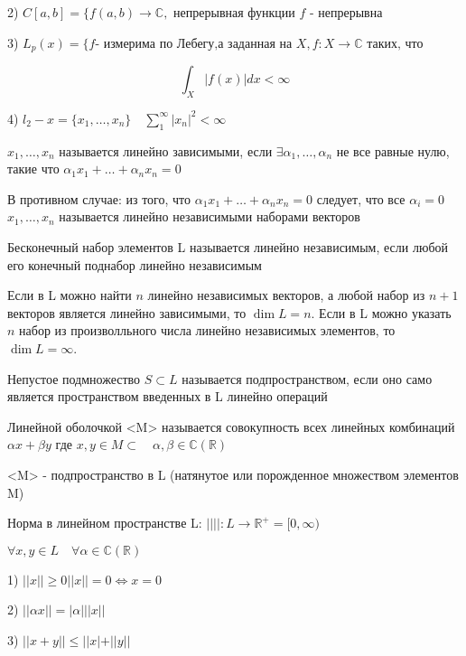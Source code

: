 \documentclass[12pt, a4paper]{report}
\begin{document}
2) \( C[a,b] = \{f(a,b) \to  \mathbb{C}, \text{ непрерывная функции } f \text{ - непрерывна }   \) 

3) \(\displaystyle  L_p (x)= \{f \text{- измерима по Лебегу,а заданная на } X , f: X \to  \mathbb{C} \text{ таких, что }   \)

\[  \int_{X}|f(x)|dx< \infty  \] 

4) \(\displaystyle  l_2 - x = \{x_1 , \ldots , x_n  \} \quad \sum ^{\infty }_{1}  |x_n| ^2 < \infty  \) 

\begin{definition}
    \( x_1, \ldots, x_n \)  называется линейно зависимыми, если \( \exists \alpha_1 , \ldots , \alpha _ n   \) не все равные нулю, такие что \( \alpha_1 x_1 + \dots + \alpha_n x_n=0   \)
    
    В противном случае: из того, что \( \alpha_1 x_1 + \dots + \alpha_n x_n=0 \) следует, что все \( \alpha_i =0  \) \( x_1, \ldots, x_n \)  называется линейно независимыми наборами  векторов  
\end{definition}

\begin{definition}
    Бесконечный набор элементов L называется линейно независимым, если любой его конечный поднабор линейно независимым
\end{definition}

\begin{definition}
    Если в L можно найти \( n  \)  линейно независимых векторов, а любой набор из \( n+1 \) векторов является линейно зависимыми, то \( \dim L= n \). Если в L можно указать \( n \)   набор из произволльного числа линейно независимых элементов, то \( \dim L= \infty  \). 
\end{definition}

\begin{definition}
    Непустое подмножество \( S \subset L  \)  называется подпространством, если оно само является пространством введенных в L линейно операций
\end{definition}

\begin{definition}
    Линейной  оболочкой  <M> называется совокупность всех линейных комбинаций  \( \alpha x + \beta y  \)  где \(  x,y \in  M  \subset \quad \alpha, \beta \in  \mathbb{C}(\mathbb{R}) \) 

    <M> - подпространство в L  (натянутое или порожденное множеством элементов M)
\end{definition}


\begin{definition}
    Норма в линейном пространстве L:  \( || || : L \to  \mathbb{R}^+ = [ 0 , \infty ) \)

    \( \forall x,y \in  L \quad  \forall  \alpha \in  \mathbb{C}(\mathbb{R}) \) 
    
    1) \( ||x|| \geq  0 ||x||=0 \Leftrightarrow x=0    \)
    
    2) \( ||\alpha x||=|\alpha|||x ||  \)  

    3) \( ||x+y|| \le  ||x|+||y|| \) 
\end{definition}
\end{document}
